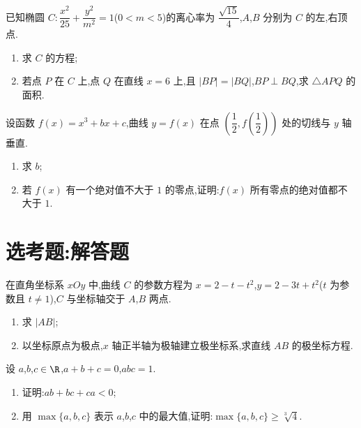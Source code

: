 \begin{problem}
已知椭圆 \(C:\dfrac{x^2}{25}+\dfrac{y^2}{m^2}=1\)(\(0<m<5\))的离心率为 \(\dfrac{\sqrt{15}}{4}\),\(A\),\(B\) 分别为 \(C\) 的左,右顶点.

\begin{enumerate}
\item 求 \(C\) 的方程;
\item 若点 \(P\) 在 \(C\) 上,点 \(Q\) 在直线 \(x=6\) 上,且 \(|BP|=|BQ|\),\(BP\perp BQ\),求 \(\triangle APQ\) 的面积.
\end{enumerate}
\end{problem}

\begin{problem}
设函数 \(f(x)=x^3+bx+c\),曲线 \(y=f(x)\) 在点 \(\left( \dfrac{1}{2},f\left( \dfrac{1}{2} \right) \right)\) 处的切线与 \(y\) 轴垂直.

\begin{enumerate}
\item 求 \(b\);
\item 若 \(f(x)\) 有一个绝对值不大于 \(1\) 的零点,证明:\(f(x)\) 所有零点的绝对值都不大于 \(1\).
\end{enumerate}
\end{problem}

\section{选考题:解答题}

\begin{problem}
在直角坐标系 \(xOy\) 中,曲线 \(C\) 的参数方程为 \(x=2-t-t^2\),\(y=2-3t+t^2\)(\(t\) 为参数且 \(t\ne1\)),\(C\) 与坐标轴交于 \(A\),\(B\) 两点.

\begin{enumerate}
\item 求 \(|AB|\);
\item 以坐标原点为极点,\(x\) 轴正半轴为极轴建立极坐标系,求直线 \(AB\) 的极坐标方程.
\end{enumerate}
\end{problem}

\begin{problem}
设 \(a\),\(b\),\(c\in \R\),\(a+b+c=0\),\(abc=1\).

\begin{enumerate}
\item 证明:\(ab+bc+ca<0\);
\item 用 \(\max\{a,b,c\}\) 表示 \(a\),\(b\),\(c\) 中的最大值,证明:\(\max\{a,b,c\}\ge \sqrt[3]{4}\).
\end{enumerate}
\end{problem}

